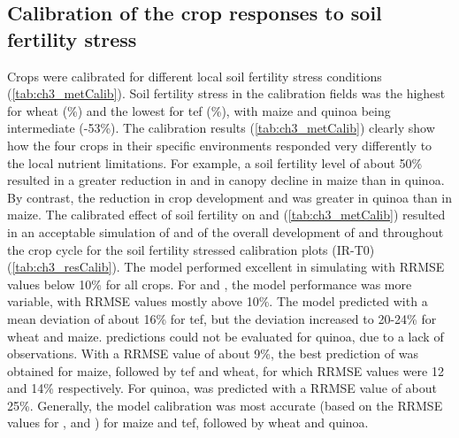 \subsection{Calibration of the crop responses to soil fertility stress}
Crops were calibrated for different local soil fertility stress conditions (\autoref{tab:ch3_metCalib}). Soil fertility stress in the calibration fields was the highest for wheat (\%) and the lowest for tef (\%), with maize and quinoa being intermediate (-53\%). The calibration results (\autoref{tab:ch3_metCalib}) clearly show how the four crops in their specific environments responded very differently to the local nutrient limitations. For example, a soil fertility level \Brel of about 50\% resulted in a greater reduction in \WPster and in canopy decline in maize than in quinoa. By contrast, the reduction in crop development and \CCx was greater in quinoa than in maize. The calibrated effect of soil fertility on \CC and \WPster (\autoref{tab:ch3_metCalib}) resulted in an acceptable simulation of \SWCr and of the overall development of \CC and \B throughout the crop cycle for the soil fertility stressed calibration plots (IR-T0) (\autoref{tab:ch3_resCalib}). The model performed excellent in simulating \SWCr with RRMSE values below 10\% for all crops. For \CC and \B, the model performance was more variable, with RRMSE values mostly above 10\%. The model predicted \CC with a mean deviation of about 16\% for tef, but the deviation increased to 20-24\% for wheat and maize. \CC predictions could not be evaluated for quinoa, due to a lack of observations. With a RRMSE value of about 9\%, the best prediction of \B was obtained for maize, followed by tef and wheat, for which RRMSE values were 12 and 14\% respectively. For quinoa, \B was predicted with a RRMSE value of about 25\%. Generally, the model calibration was most accurate (based on the RRMSE values for \SWCr, \CC and \B) for maize and tef, followed by wheat and quinoa.


